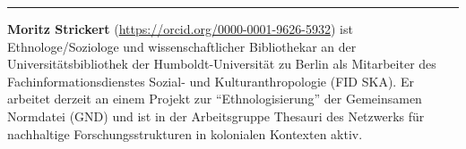 \begin{center}\rule{0.5\linewidth}{0.5pt}\end{center}

\textbf{Moritz Strickert} (\url{https://orcid.org/0000-0001-9626-5932})
ist Ethnologe/Soziologe und wissenschaftlicher Bibliothekar an der
Universitätsbibliothek der Humboldt-Universität zu Berlin als
Mitarbeiter des Fachinformationsdienstes Sozial- und Kulturanthropologie
(FID SKA). Er arbeitet derzeit an einem Projekt zur ``Ethnologisierung''
der Gemeinsamen Normdatei (GND) und ist in der Arbeitsgruppe Thesauri
des Netzwerks für nachhaltige Forschungsstrukturen in kolonialen
Kontexten aktiv.
